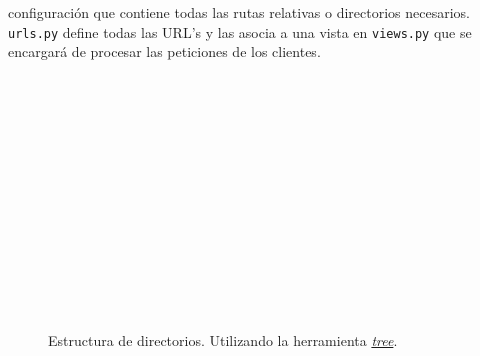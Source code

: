 \documentclass[a4paper, 12pt]{book}
\begin{document}
\begin{itemize}
  configuraci\'on que contiene todas las rutas relativas o directorios necesarios. \texttt{urls.py} define todas las URL's y las asocia a una vista en
  \texttt{views.py} que se encargar\'a de procesar las peticiones de los clientes.\\\\\\\\\\\\\\\\\\\\\\\\\\\\
\end{itemize}


\begin{figure}
  \centering
  \caption{Estructura de directorios. Utilizando la herramienta \href{http://www.computerhope.com/unix/tree.htm}{\textit{tree}}.}
  \label{fig:arquitectura}
\end{figure}
\end{document}
